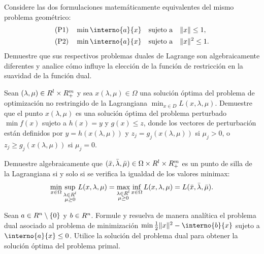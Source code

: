\begin{exercise}\label{v1:ejer:5.2.4}
 Considere las dos formulaciones matemáticamente equivalentes del mismo problema geométrico:
 \[
 \begin{aligned}
 \text{(P1)} \quad & \min \interno{a}{x} \quad \text{sujeto a} \quad \norm{x} \le 1, \\
 \text{(P2)} \quad & \min \interno{a}{x} \quad \text{sujeto a} \quad \norm{x}^2 \le 1.
 \end{aligned}
 \]
 Demuestre que sus respectivos problemas duales de Lagrange son algebraicamente diferentes y analice cómo influye la elección de la función de restricción en la suavidad de la función dual.
\end{exercise}

\begin{exercise}\label{v1:ejer:5.2.5}
 Sean $(\lambda, \mu) \in R^l \times R^m_+$ y sea $x(\lambda, \mu) \in \Omega$ una solución óptima del problema de optimización no restringido de la Lagrangiana $\min_{x \in D} L(x, \lambda, \mu)$. Demuestre que el punto $x(\lambda, \mu)$ es una solución óptima del problema perturbado $\min f(x)$ sujeto a $h(x) = y$ y $g(x) \le z$, donde los vectores de perturbación están definidos por $y = h(x(\lambda, \mu))$ y $z_j = g_j(x(\lambda, \mu))$ si $\mu_j > 0$, o $z_j \ge g_j(x(\lambda, \mu))$ si $\mu_j = 0$.
\end{exercise}

\begin{exercise}\label{v1:ejer:5.2.6}
 Demuestre algebraicamente que $(\bar{x}, \bar{\lambda}, \bar{\mu}) \in \Omega \times R^l \times R^m_+$ es un punto de silla de la Lagrangiana
 si y solo si se verifica la igualdad de los valores minimax:
 \[
 \min_{x \in \Omega} \sup_{\substack{\lambda \in R^l \\ \mu \ge 0}} L(x, \lambda, \mu) = \max_{\substack{\lambda \in R^l \\ \mu \ge 0}} \inf_{x \in \Omega}
 L(x, \lambda, \mu) = L(\bar{x}, \bar{\lambda}, \bar{\mu}).
 \]
\end{exercise}

\begin{exercise}\label{v1:ejer:5.2.7}
 Sean $a \in R^n \setminus \{0\}$ y $b \in R^n$. Formule y resuelva de manera analítica el problema dual asociado al problema de minimización $\min \frac{1}{2} \norm{x} ^2 - \interno{b}{x}$ sujeto a $\interno{a}{x} \le 0$. Utilice la solución del problema dual para obtener la solución óptima del problema primal.
\end{exercise}

